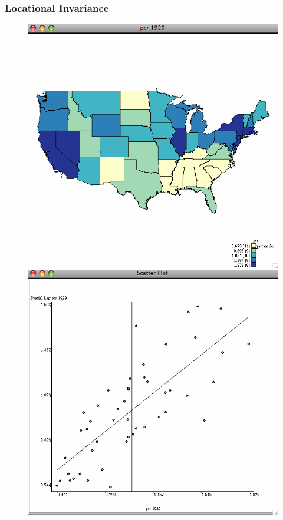 \documentclass[nototal,handout]{beamer}
\begin{document}
\begin{frame}
	\frametitle{Locational Invariance}
 \begin{figure}[ht]
  \begin{minipage}[b]{0.4\linewidth}
  \centering
  \includegraphics[scale=0.20]{income29.png}
  \end{minipage}
  \begin{minipage}[b]{0.4\linewidth}
  \centering
  \includegraphics[scale=0.20]{moran29.png}

\end{minipage}
\end{figure}
\end{frame}
\end{document}

